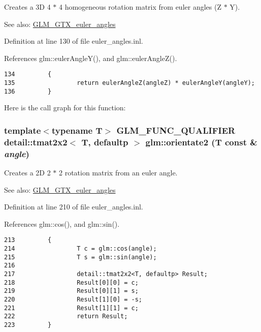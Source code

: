 Creates a 3D 4 $\ast$ 4 homogeneous rotation matrix from euler angles (Z $\ast$ Y). \begin{Desc}
\item[See also:]\hyperlink{group__gtx__euler__angles}{GLM\_\-GTX\_\-euler\_\-angles} \end{Desc}


Definition at line 130 of file euler\_\-angles.inl.

References glm::eulerAngleY(), and glm::eulerAngleZ().

\begin{Code}\begin{verbatim}134         {
135                 return eulerAngleZ(angleZ) * eulerAngleY(angleY);
136         }
\end{verbatim}
\end{Code}




Here is the call graph for this function:\hypertarget{group__gtx__euler__angles_g026f776506cd9c5b144c6d4b410a079b}{
\subsubsection[orientate2]{\setlength{\rightskip}{0pt plus 5cm}template$<$typename T$>$ GLM\_\-FUNC\_\-QUALIFIER detail::tmat2x2$<$ T, defaultp $>$ glm::orientate2 (T const \& {\em angle})}}
\label{group__gtx__euler__angles_g026f776506cd9c5b144c6d4b410a079b}


Creates a 2D 2 $\ast$ 2 rotation matrix from an euler angle. \begin{Desc}
\item[See also:]\hyperlink{group__gtx__euler__angles}{GLM\_\-GTX\_\-euler\_\-angles} \end{Desc}


Definition at line 210 of file euler\_\-angles.inl.

References glm::cos(), and glm::sin().

\begin{Code}\begin{verbatim}213         {
214                 T c = glm::cos(angle);
215                 T s = glm::sin(angle);
216 
217                 detail::tmat2x2<T, defaultp> Result;
218                 Result[0][0] = c;
219                 Result[0][1] = s;
220                 Result[1][0] = -s;
221                 Result[1][1] = c;
222                 return Result;
223         }
\end{verbatim}
\end{Code}




